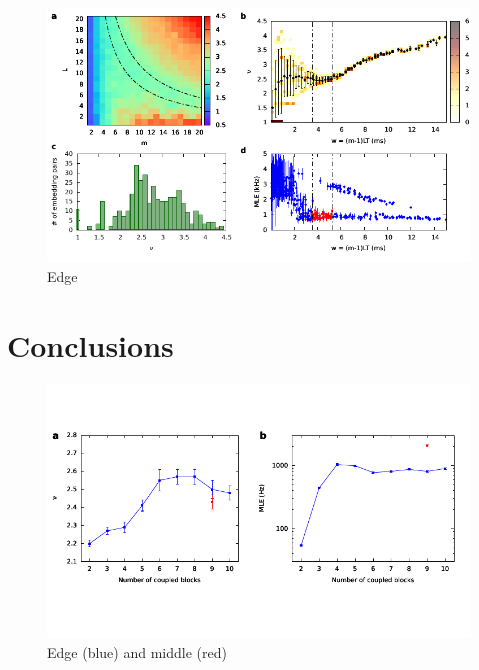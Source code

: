 \begin{figure}[H]
    \centering
    \includegraphics[width=\linewidth]{../10_blocks/2e5_points/plots/chaos_low.pdf}
    \caption{Edge}
    \label{fig:10 blocks chaos}
\end{figure}

\section{Conclusions}

\begin{figure}[H]
    \centering
    \includegraphics[width=\linewidth,trim={0 1.5cm 0 1.3cm},clip]
    {../data/nu_mle_blocks.pdf}
    \caption{Edge (blue) and middle (red)}
    \label{fig:nu mle blocks}
\end{figure}
